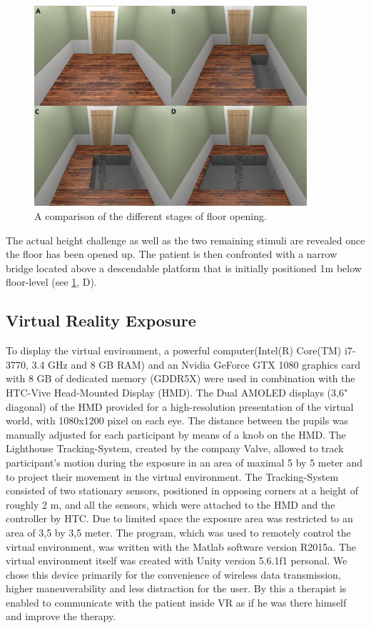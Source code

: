 \begin{figure}[h]
\centering
\includegraphics[width=0.9\textwidth]{images/OpenComparison.png}
\caption{A comparison of the different stages of floor opening.}
\label{OpenImg}
\end{figure}

The actual height challenge as well as the two remaining stimuli are revealed once the floor has been opened up. The patient is then confronted with a narrow bridge located above a descendable platform that is initially positioned 1m below floor-level (see \ref{OpenImg}, D).




\subsection{Virtual Reality Exposure}
To display the virtual environment, a powerful computer(Intel(R) Core(TM) i7-3770, 3.4 GHz and 8 GB RAM) and an Nvidia GeForce GTX 1080 graphics card with 8 GB of dedicated memory (GDDR5X) were used in combination with the HTC-Vive Head-Mounted Display (HMD). The Dual AMOLED displays (3,6" diagonal) of the HMD provided for a high-resolution presentation of the virtual world, with 1080x1200 pixel on each eye. The distance between the pupils was manually adjusted for each participant by means of a knob on the HMD. The Lighthouse Tracking-System, created by the company Valve, allowed to track participant's motion during the exposure in an area of maximal 5 by 5 meter and to project their movement in the virtual environment. The Tracking-System consisted of two stationary sensors, positioned in opposing corners at a height of roughly 2 m, and all the sensors, which were attached to the HMD and the controller by HTC. Due to limited space the exposure area was restricted to an area of 3,5 by 3,5 meter. The program, which was used to remotely control the virtual environment, was written with the Matlab software version R2015a. The virtual environment itself was created with Unity version 5.6.1f1 personal. %
We chose this device primarily for the convenience of wireless data transmission, higher maneuverability and less distraction for the user. 
By this a therapist is enabled to communicate with the patient inside VR as if he was there himself and improve the therapy.


